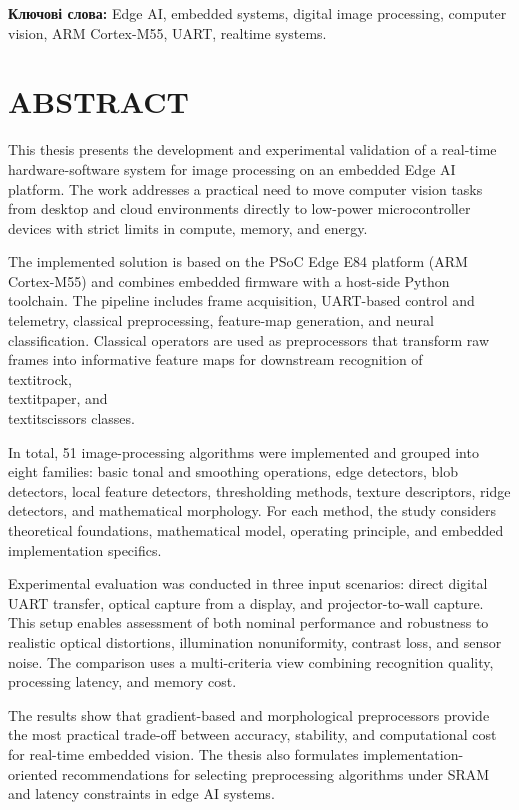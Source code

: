 \documentclass[a4paper,12pt]{article}
\let\oldsection\section
\renewcommand{\section}{\clearpage\oldsection}
\begin{document}
\textbf{Ключові слова:} Edge AI, embedded systems, digital image processing, computer vision, ARM Cortex-M55, UART, realtime systems.

\newpage

\section*{ABSTRACT}
This thesis presents the development and experimental validation of a real-time hardware-software system for image processing on an embedded Edge AI platform. The work addresses a practical need to move computer vision tasks from desktop and cloud environments directly to low-power microcontroller devices with strict limits in compute, memory, and energy.

The implemented solution is based on the PSoC Edge E84 platform (ARM Cortex-M55) and combines embedded firmware with a host-side Python toolchain. The pipeline includes frame acquisition, UART-based control and telemetry, classical preprocessing, feature-map generation, and neural classification. Classical operators are used as preprocessors that transform raw frames into informative feature maps for downstream recognition of \\textit{rock}, \\textit{paper}, and \\textit{scissors} classes.

In total, 51 image-processing algorithms were implemented and grouped into eight families: basic tonal and smoothing operations, edge detectors, blob detectors, local feature detectors, thresholding methods, texture descriptors, ridge detectors, and mathematical morphology. For each method, the study considers theoretical foundations, mathematical model, operating principle, and embedded implementation specifics.

Experimental evaluation was conducted in three input scenarios: direct digital UART transfer, optical capture from a display, and projector-to-wall capture. This setup enables assessment of both nominal performance and robustness to realistic optical distortions, illumination nonuniformity, contrast loss, and sensor noise. The comparison uses a multi-criteria view combining recognition quality, processing latency, and memory cost.

The results show that gradient-based and morphological preprocessors provide the most practical trade-off between accuracy, stability, and computational cost for real-time embedded vision. The thesis also formulates implementation-oriented recommendations for selecting preprocessing algorithms under SRAM and latency constraints in edge AI systems.
\end{document}
